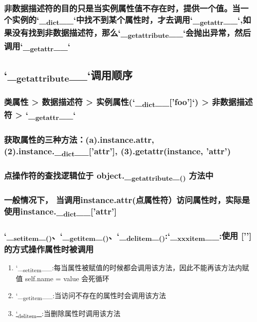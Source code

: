 \documentclass[11pt]{article}
\begin{document}
\subsubsection{非数据描述符的目的只是当实例属性值不存在时，提供一个值。当一个实例的`\_\textsubscript{dict}\_\_`中找不到某个属性时，才去调用`\_\textsubscript{getattr}\_\_`,如果没有找到非数据描述符，那么`\_\textsubscript{getattribute}\_\_`会抛出异常，然后调用`\_\textsubscript{getattr}\_\_`}
\label{sec:org1581afa}
\subsection{`\_\textsubscript{getattribute}\_\_`调用顺序}
\label{sec:org07429d1}
\subsubsection{类属性 > 数据描述符 > 实例属性(`\_\textsubscript{dict}\_\_['foo']`) > 非数据描述符 > `\_\textsubscript{getattr}\_\_`}
\label{sec:org4666bae}
\subsubsection{获取属性的三种方法：(a).instance.attr, (2).instance.\_\textsubscript{dict}\_\_['attr'], (3).getattr(instance, 'attr')}
\label{sec:orgab02e65}
\subsubsection{点操作符的查找逻辑位于 object.\_\textsubscript{getattribute}\_\textsubscript{()} 方法中}
\label{sec:org4edd554}
\subsubsection{一般情况下， 当调用instance.attr(点属性符）访问属性时，实际是使用instance.\_\textsubscript{dict}\_\_['attr']}
\label{sec:orgb90037f}
\subsubsection{`\_\textsubscript{setitem}\_\textsubscript{()}、`\_\textsubscript{getitem}\_\textsubscript{()}、`\_\textsubscript{delitem}\_\textsubscript{()}:`\_\textsubscript{xxxitem}\_\_:使用 [''] 的方式操作属性时被调用}
\label{sec:org45a5aeb}
\begin{enumerate}
\item `\_\textsubscript{setitem}\_\_:每当属性被赋值的时候都会调用该方法，因此不能再该方法内赋值 self.name = value 会死循环
\label{sec:orgab2f84d}
\item `\_\textsubscript{getitem}\_\_:当访问不存在的属性时会调用该方法
\label{sec:orgdd77491}
\item \underline{`\textsubscript{delitem}\_}:当删除属性时调用该方法
\label{sec:org010a2bf}
\end{enumerate}
\end{document}
